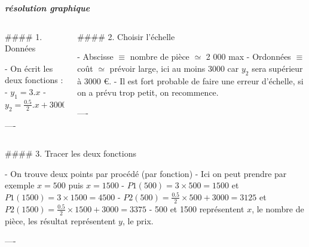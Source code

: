 \documentclass{beamer}
\begin{document}
\begin{frame}[fragile]\centering

\textbf{\textit{résolution graphique}}

\begin{columns}
\begin{column}{0.57\textwidth}

\begin{markdown}

#### 1. Données

- On écrit les deux fonctions :
- $y_1 = 3.x$
- $y_2 = \frac{0.5}{2}.x+3000$



----
\end{markdown}

\end{column}




\begin{column}{.4\textwidth}
\begin{markdown}




#### 2. Choisir l'échelle

- Abscisse $\equiv$ nombre de pièce $\simeq$ 2 000 max
- Ordonnées $\equiv$ coût $\simeq$ prévoir large, ici au moins 3000 car $y_2$ sera supérieur à 3000 \euro.
- Il est fort probable de faire une erreur d'échelle, si on a prévu trop petit, on recommence.

----
\end{markdown}


\end{column}

\end{columns}

\bigskip

\begin{markdown}

#### 3. Tracer les deux fonctions

- On trouve deux points par procédé (par fonction)
- Ici on peut prendre par exemple $x=500$ puis $x=1500$
- $P1(500)=3\times 500 = 1500$ et $P1(1500)=3\times 1500=4500$
- $P2(500)=\frac{0.5}{2}\times 500 + 3000 = 3125$ et $P2(1500)=\frac{0.5}{2}\times 1500 + 3000=3375$ 
- 500 et 1500 représentent $x$, le nombre de pièce, les résultat représentent $y$, le prix.

----

\end{markdown}




\bigskip


\end{frame}
\end{document}
